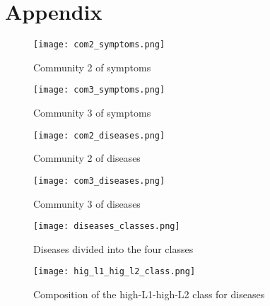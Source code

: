 \section{Appendix}


\begin{figure}[H]
	\centering
	\texttt{[image: com2\_symptoms.png]}
	\caption{Community 2 of symptoms}
	\label{fig:com2_symptoms}
 \end{figure}
 \noindent
 \begin{figure}[H]
	\centering
	\texttt{[image: com3\_symptoms.png]}
	\caption{Community 3 of symptoms}
	\label{fig:com3_symptoms}
 \end{figure}
 \noindent
 
 
 \begin{figure}[H]
	\centering
	\texttt{[image: com2\_diseases.png]}
	\caption{Community 2 of diseases}
	\label{fig:com2_diseases}
 \end{figure}
 \noindent
 \begin{figure}[H]
	\centering
	\texttt{[image: com3\_diseases.png]}
	\caption{Community 3 of diseases}
	\label{fig:com3_diseases}
 \end{figure}
 \noindent


 \begin{figure}[H]
	\centering
	\texttt{[image: diseases\_classes.png]}
	\caption{Diseases divided into the four classes}
	\label{fig:diseases_classes}
 \end{figure}
 
 \begin{figure*}[!t]
	\centering
	\texttt{[image: hig\_l1\_hig\_l2\_class.png]}
	\caption{Composition of the high-L1-high-L2 class for diseases}
	\label{fig:high_l1_high_l2_class}
 \end{figure*}